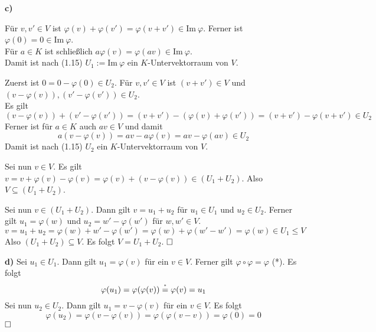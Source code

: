 \documentclass[a4paper,graphics,11pt]{article}
\newcommand{\up}[2]{\mathrel{\overset{\makebox[0pt]{\mbox{\normalfont\tiny #2}}}{#1}}}
\begin{document}
\textbf{c)}

Für $v, v' \in V$ ist $\varphi(v) + \varphi(v') = \varphi(v+v') \in \text{Im}\ \varphi$.
Ferner ist $\varphi(0) = 0 \in \text{Im}\ \varphi$.\\
Für $a \in K$ ist schließlich $a\varphi(v) = \varphi(av) \in \text{Im}\ \varphi$.\\
Damit ist nach (1.15)
$U_1 := \text{Im}\ \varphi$ ein $K$-Untervektorraum von $V$.

\newpage

Zuerst ist $0 = 0 - \varphi(0) \in U_2$.
Für $v, v' \in V$ ist $(v+v') \in V$ und $(v - \varphi(v)), (v' -\varphi(v')) \in U_2$.\\
Es gilt
$$
    (v - \varphi(v)) + (v' - \varphi(v'))
    = (v + v') - (\varphi(v) + \varphi(v'))
    = (v+v') - \varphi(v+v') \in U_2
$$
Ferner ist für $a \in K$ auch $av \in V$ und damit
$$
    a(v - \varphi(v)) = av - a\varphi(v) = av - \varphi(av) \in U_2
$$
Damit ist nach (1.15) $U_2$ ein $K$-Untervektorraum von $V$.

Sei nun $v \in V$. Es gilt $v = v + \varphi(v) - \varphi(v) = \varphi(v) + (v - \varphi(v)) \in (U_1 + U_2)$.
Also $V \subseteq (U_1 + U_2)$.

Sei nun $v \in (U_1 + U_2)$. Dann gilt $v = u_1 + u_2$ für $u_1 \in U_1$ und $u_2 \in U_2$.
Ferner gilt $u_1 = \varphi(w)$ und $u_2 = w' - \varphi(w')$ für $w,w' \in V$.
$$
    v
    = u_1+u_2 = \varphi(w) + w' - \varphi(w') = \varphi(w) + \varphi(w'-w') = \varphi(w) \in U_1 \leq V
$$
Also $(U_1 + U_2) \subseteq V$. Es folgt $V = U_1 + U_2$. $\hfill\square$

\textbf{d)}
Sei $u_1 \in U_1$. Dann gilt $u_1 = \varphi(v)$ für ein $v \in V$. Ferner gilt $\varphi \circ \varphi = \varphi$ (*).
Es folgt
$$
    \varphi(u_1)
    = \varphi(\varphi(v))
    \up{=}{*} \varphi(v)
    = u_1
$$
Sei nun $u_2 \in U_2$. Dann gilt $u_1 = v - \varphi(v)$ für ein $v \in V$. Es folgt
$$
    \varphi(u_2)
    = \varphi(v - \varphi(v))
    = \varphi(\varphi(v - v))
    = \varphi(0)
    = 0
$$
$\strut\hfill\square$
\end{document}
